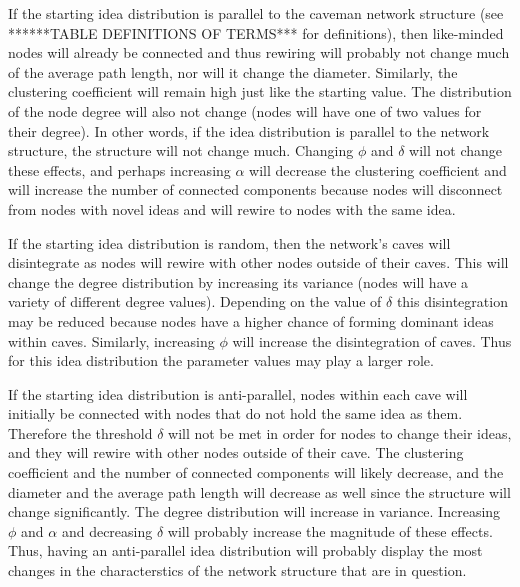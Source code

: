 If the starting idea distribution is parallel to the caveman network structure (see ******TABLE DEFINITIONS OF TERMS*** for definitions), then like-minded nodes will already be connected and thus rewiring will probably not change much of the average path length, nor will it change the diameter. Similarly, the clustering coefficient will remain high just like the starting value. The distribution of the node degree will also not change (nodes will have one of two values for their degree). In other words, if the idea distribution is parallel to the network structure, the structure will not change much. Changing $\phi$ and $\delta$ will not change these effects, and perhaps increasing $\alpha$ will decrease the clustering coefficient and will increase the number of connected components because nodes will disconnect from nodes with novel ideas and will rewire to nodes with the same idea.

If the starting idea distribution is random, then the network's caves will disintegrate as nodes will rewire with other nodes outside of their caves. This will change the degree distribution by increasing its variance (nodes will have a variety of different degree values). Depending on the value of $\delta$ this disintegration may be reduced because nodes have a higher chance of forming dominant ideas within caves. Similarly, increasing $\phi$ will increase the disintegration of caves. Thus for this idea distribution the parameter values may play a larger role.

If the starting idea distribution is anti-parallel, nodes within each cave will initially be connected with nodes that do not hold the same idea as them. Therefore the threshold $\delta$ will not be met in order for nodes to change their ideas, and they will rewire with other nodes outside of their cave. The clustering coefficient and the number of connected components will likely decrease, and the diameter and the average path length will decrease as well since the structure will change significantly. The degree distribution will increase in variance. Increasing $\phi$ and $\alpha$ and decreasing $\delta$ will probably increase the magnitude of these effects. Thus, having an anti-parallel idea distribution will probably display the most changes in the characterstics of the network structure that are in question.



